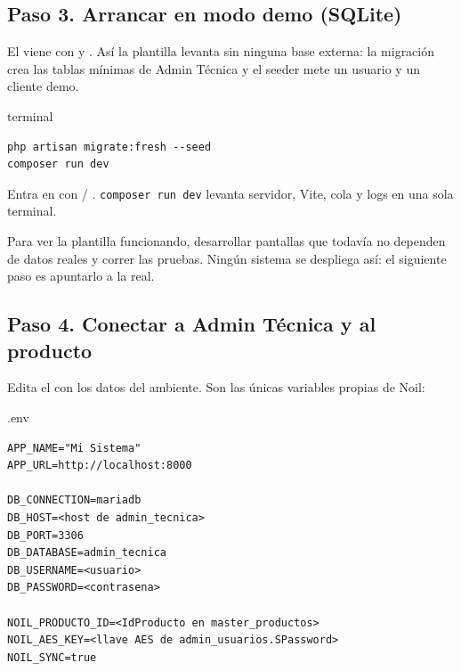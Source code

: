\documentclass[11pt]{article}
\newcommand{\infonote}[2]{%
\par\addvspace{4pt}\noindent
\begin{tcolorbox}[enhanced,breakable,colback=noilblue!7,colframe=noilblue,boxrule=0.8pt,arc=2pt,
  left=8pt,right=8pt,top=4pt,bottom=4pt,fonttitle=\bfseries\color{white},
  colbacktitle=noilblue,title={#1}]
\small #2
\end{tcolorbox}\par\addvspace{4pt}}
\begin{document}
\subsection{Paso 3. Arrancar en modo demo (SQLite)}
El  viene con  y . As\'i la plantilla levanta sin ninguna base externa: la migraci\'on crea las tablas m\'inimas de Admin T\'ecnica y el seeder mete un usuario y un cliente demo.
\begin{termbox}{terminal}
\begin{lstlisting}[style=plain]
php artisan migrate:fresh --seed
composer run dev
\end{lstlisting}
\end{termbox}
Entra en  con  / . \texttt{composer run dev} levanta servidor, Vite, cola y logs en una sola terminal.

\infonote{Para qu\'e sirve el modo demo}{Para ver la plantilla funcionando, desarrollar pantallas que todav\'ia no dependen de datos reales y correr las pruebas. Ning\'un sistema se despliega as\'i: el siguiente paso es apuntarlo a la \code{admin_tecnica} real.}

\subsection{Paso 4. Conectar a Admin T\'ecnica y al producto}
Edita el  con los datos del ambiente. Son las \'unicas variables propias de Noil:
\begin{termbox}{.env}
\begin{lstlisting}[style=plain]
APP_NAME="Mi Sistema"
APP_URL=http://localhost:8000

DB_CONNECTION=mariadb
DB_HOST=<host de admin_tecnica>
DB_PORT=3306
DB_DATABASE=admin_tecnica
DB_USERNAME=<usuario>
DB_PASSWORD=<contrasena>

NOIL_PRODUCTO_ID=<IdProducto en master_productos>
NOIL_AES_KEY=<llave AES de admin_usuarios.SPassword>
NOIL_SYNC=true
\end{lstlisting}
\end{termbox}
\end{document}
